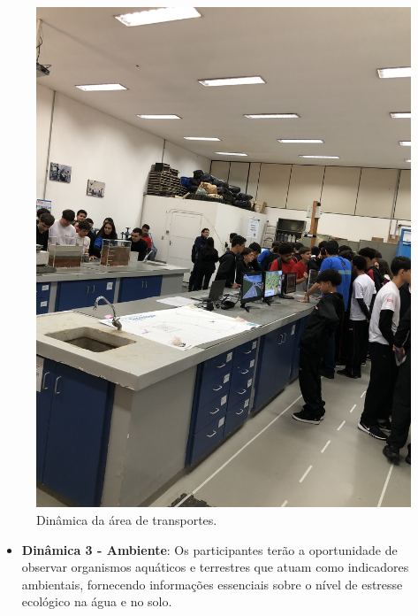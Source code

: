 \documentclass[
  letterpaper,
  DIV=11,
  numbers=noendperiod]{scrreprt}
\providecommand{\tightlist}{%
  \setlength{\itemsep}{0pt}\setlength{\parskip}{0pt}}\usepackage{longtable,booktabs,array}
\begin{document}
\begin{figure}[H]

{\centering \includegraphics[width=0.6\linewidth,height=\textheight,keepaspectratio]{planejamento/dinamica-transportes.jpg}

}

\caption{Dinâmica da área de transportes.}

\end{figure}%

\begin{itemize}
\tightlist
\item
  \textbf{Dinâmica 3 - Ambiente}: Os participantes terão a oportunidade
  de observar organismos aquáticos e terrestres que atuam como
  indicadores ambientais, fornecendo informações essenciais sobre o
  nível de estresse ecológico na água e no solo.
\end{itemize}
\end{document}
